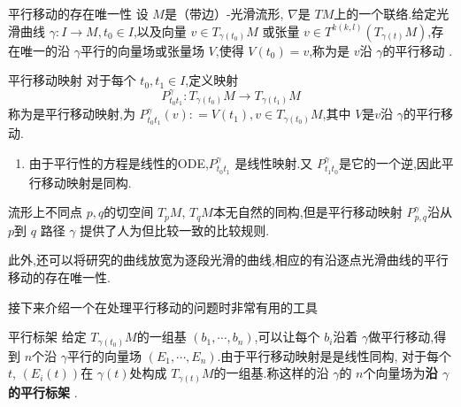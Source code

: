 \documentclass[../../main.tex]{subfiles}
\begin{document}
\begin{theorem}{平行移动的存在唯一性}
    设 \(  M  \)是（带边）-光滑流形,  \(   \nabla   \)是 \(  TM  \)上的一个联络.给定光滑曲线 \(   \gamma : I\to M  , t_0 \in I\),以及向量 \(  v \in T_{ \gamma \left( t_0 \right) }M  \) 
    或张量 \(  v \in T^{k\left( k,l \right) }\left( T_{ \gamma \left( t \right) }M \right)   \),存在唯一的沿 \(   \gamma   \)平行的向量场或张量场 \(  V  \),使得 \(  V\left( t_0 \right)= v   \),称为是 \(  v  \)沿 \(   \gamma   \)的平行移动  .        
\end{theorem}


\begin{definition}{平行移动映射}
    对于每个 \(  t_0 ,t_1 \in I  \),定义映射 \[
    P_{t_0t_1}^{ \gamma }: T_{ \gamma \left( t_0 \right) }M\to T_{ \gamma \left( t_1 \right) }M
    \]称为是平行移动映射,为 \(  P_{t_0t_1}^{ \gamma }\left( v \right): =  V\left( t_1 \right), v \in T_{ \gamma \left( t_0 \right) }M    \),其中 \(  V  \)是\(   v  \)沿 \(   \gamma   \)的平行移动.     
\end{definition}

\begin{remark}
    \begin{enumerate}
        \item  由于平行性的方程是线性的ODE,\(  P_{t_0t_1}^{ \gamma }  \) 是线性映射.又 \(  P_{t_1t_0}^{ \gamma }  \)是它的一个逆,因此平行移动映射是同构. 
    \end{enumerate}
    
\end{remark}

\begin{note}
    流形上不同点 \(  p,q  \)的切空间 \(  T_{p}M  \), \(  T_{q}M  \)本无自然的同构,但是平行移动映射 \(  P^{\gamma }_{p,q}  \)沿从 \(  p  \)到 \(  q  \)  路径 \(   \gamma   \)   
    提供了人为但比较一致的比较规则.  
\end{note}



此外,还可以将研究的曲线放宽为逐段光滑的曲线,相应的有沿逐点光滑曲线的平行移动的存在唯一性.

接下来介绍一个在处理平行移动的问题时非常有用的工具 
\begin{definition}{平行标架}
    给定 \(  T_{ \gamma \left( t_0 \right) }M  \)的一组基 \(  \left(  b_1,\cdots,b_n  \right)   \),可以让每个 \(  b_{i}  \)沿着 \(   \gamma   \)做平行移动,得到 \(  n  \)个沿 \(   \gamma   \)平行的向量场 \(  \left(  E_1,\cdots,E_n  \right)   \).由于平行移动映射是是线性同构, 对于每个 \(  t  \), \(  \left( E_{i}\left( t \right)  \right)   \)在 \(   \gamma \left( t \right)   \)处构成 \(  T_{ \gamma \left( t \right) }M  \)的一组基.称这样的沿 \(   \gamma   \)的 \(  n  \)个向量场为\textbf{沿 \(   \gamma   \)的平行标架 }.             
\end{definition}
\end{document}
